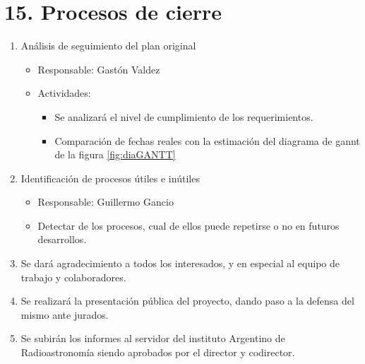 \documentclass[11pt, %
codirector, %
]{charter}
\begin{document}
\section{15. Procesos de cierre}    
\label{sec:cierre}
\begin{enumerate}
	\item Análisis de seguimiento del plan original 
		\begin{itemize}
		\item Responsable: Gastón Valdez
		\item Actividades: 
			\begin{itemize}
				\item Se analizará el nivel de cumplimiento de los requerimientos.
				\item Comparación de fechas reales con la estimación del diagrama de gannt de la figura 	\ref{fig:diaGANTT}
			\end{itemize}
		\end{itemize}
	\item Identificación de procesos útiles e inútiles
		\begin{itemize}
			\item Responsable: Guillermo Gancio 
			\item Detectar de los procesos, cual de ellos puede repetirse o no en futuros desarrollos. 
		\end{itemize}
	\item Se dará agradecimiento a todos los interesados, y en especial al equipo de trabajo y
	colaboradores.
	\item Se realizará la presentación pública del proyecto, dando paso a la defensa del mismo ante jurados. 
	\item Se subirán los informes al servidor del instituto Argentino de Radioastronomía siendo aprobados por el director y codirector. 
\end{enumerate}
\end{document}
